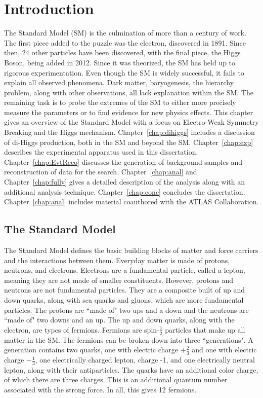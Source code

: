 \chapter{Introduction}
\label{chap:intro}
The Standard Model (SM) is the culmination of more than a century of work. The first piece added to the puzzle was the electron, discovered in 1891. Since then, 24 other particles have been discovered, with the final piece, the Higgs Boson, being added in 2012. Since it was theorized, the SM has held up to rigorous experimentation. Even though the SM is widely successful, it fails to explain all observed phenomena. Dark matter, baryogenesis, the hierarchy problem, along with other observations, all lack explanation within the SM. The remaining task is to probe the extremes of the SM to either more precisely measure the parameters or to find evidence for new physics effects.\newline
\indent This chapter gives an overview of the Standard Model with a focus on Electro-Weak Symmetry Breaking and the Higgs mechanism. Chapter~\ref{chap:dihiggs} includes a discussion of di-Higgs production, both in the SM and beyond the SM. Chapter~\ref{chap:exp} describes the experimental apparatus used in this dissertation. Chapter~\ref{chap:EvtReco} discusses the generation of background samples and reconstruction of data for the search. Chapter~\ref{chap:anal} and Chapter~\ref{chap:fully} gives a detailed description of the analysis along with an additional analysis technique. Chapter~\ref{chap:conc} concludes the dissertation. Chapter~\ref{chap:anal} includes material coauthored with the ATLAS Collaboration.
\section{The Standard Model}
The Standard Model defines the basic building blocks of matter and force carriers and the interactions between them. Everyday matter is made of protons, neutrons, and electrons. Electrons are a fundamental particle, called a lepton, meaning they are not made of smaller constituents. However, protons and neutrons are not fundamental particles. They are a composite built of up and down quarks, along with sea quarks and gluons, which  are more fundamental particles. The protons are ``made of" two ups and a down and the neutrons are ``made of" two downs and an up. The up and down quarks, along with the electron, are types of fermions. \newline
\indent Fermions are spin-${\frac{1}{2}}$ particles that make up all matter in the SM. The fermions can be broken down into three ``generations". A generation contains two quarks, one with electric charge ${+\frac{2}{3}}$ and one with electric charge ${-\frac{1}{3}}$, one electrically charged lepton, charge -1, and one electrically neutral lepton, along with their antiparticles. The quarks have an additional color charge, of which there are three charges. This is an additional quantum number associated with the strong force. In all, this gives 12 fermions. \newline 

